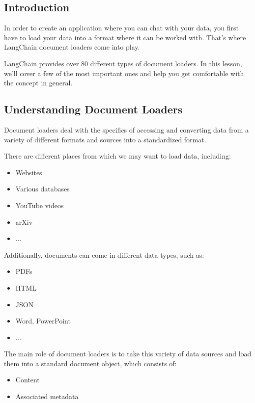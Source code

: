 \documentclass{article}
\begin{document}
\subsection{Introduction}
In order to create an application where you can chat with your data, you first have to load your data into a format where it can be worked with. That's where LangChain document loaders come into play. 

LangChain provides over 80 different types of document loaders. In this lesson, we'll cover a few of the most important ones and help you get comfortable with the concept in general.

\subsection{Understanding Document Loaders}

Document loaders deal with the specifics of accessing and converting data from a variety of different formats and sources into a standardized format. 

There are different places from which we may want to load data, including:

\begin{itemize}
    \item Websites
    \item Various databases
    \item YouTube videos
    \item arXiv
    \item ...
\end{itemize}

Additionally, documents can come in different data types, such as:

\begin{itemize}
    \item PDFs
    \item HTML
    \item JSON
    \item Word, PowerPoint
    \item ...
\end{itemize}

The main role of document loaders is to take this variety of data sources and load them into a standard document object, which consists of:

\begin{itemize}
    \item Content
    \item Associated metadata
\end{itemize}
\end{document}
